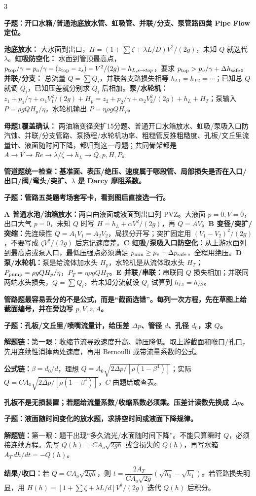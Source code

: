 \documentclass[a4paper]{article}
\newcommand{\qt}[1]{\vspace{0.10pt}\colorbox{Q}{\parbox{\dimexpr\linewidth-2\fboxsep}{\color{white}\bfseries #1}}\par}
\newcommand{\ans}[1]{\colorbox{G}{\parbox{\dimexpr\linewidth-2\fboxsep}{#1}}\par}
\newcommand{\warn}[1]{\colorbox{Y}{\parbox{\dimexpr\linewidth-2\fboxsep}{\color{E}\bfseries #1}}\par}
\newcommand{\chain}[1]{{\color{A}\bfseries 解题链：}#1\par}
\newcommand{\res}[1]{{\color{E}\bfseries 结果/收口：}#1\par}
\newcommand{\form}[1]{{\color{M}\bfseries 公式链：}#1\par}
\begin{document}
\begin{multicols}{3}
\qt{子题：开口水箱/普通池底放水管、虹吸管、并联/分支、泵管路四类 Pipe Flow 定位。}
\ans{\textbf{池底放水：} 大水面到出口，$H=(1+\sum\zeta+\lambda L/D)V^2/(2g)$，未知 $Q$ 就迭代 $\lambda$。\textbf{虹吸防空化：} 水面到管顶最高点，$p_{\rm top}/\gamma=p_a/\gamma-(z_{\rm top}-z_s)-V^2/(2g)-h_{L,s\to top}$，要求 $p_{\rm top}>p_v/\gamma+\Delta h_{\rm safe}$。\textbf{并联/分支：} 总流量 $Q=\sum Q_i$，并联各支路损失相等 $h_{L1}=h_{L2}=\cdots$；已知总 $Q$ 就调 $Q_i$，已知压差就分别求 $Q_i$ 后相加。\textbf{泵/水轮机：} $z_1+p_1/\gamma+\alpha_1V_1^2/(2g)+H_p=z_2+p_2/\gamma+\alpha_2V_2^2/(2g)+h_L+H_T$；泵输入 $P=\rho gQH_p/\eta$，水轮机输出 $P=\eta\rho gQH_T$。}
\ans{\textbf{母题1覆盖确认：} 两油箱变径突扩15分题、普通开口水箱放水、虹吸/泵吸入口防汽蚀、并联/分支管路、泵扬程/水轮机功率、粗糙管反推粗糙度、孔板/文丘里流量计、液面随时间下降，都归到这一母题；共同骨架都是 $A\to V\to Re\to\lambda/\zeta\to h_L\to Q,p,H,P$。}
\warn{管道题统一检查：基准面、表压/绝压、速度属于哪段管、局部损失是否在入口/出口/阀/弯头/突扩、$\lambda$ 是 Darcy 摩阻系数。}

\qt{子题：管路五类题考场套写卡，看到图后直接选一行。}
\ans{\textbf{A 普通水池/油箱放水：}两自由液面或液面到出口列 PVZ。大液面 $p=0,V=0$，出口大气 $p=0$，未知 $Q$ 时写 $H=h_L+\alpha V^2/(2g)$，再 $Q=AV$。\textbf{B 变径/突扩/突缩：}先连续性 $Q=A_1V_1=A_2V_2$，局损分开写；突扩固定用 $(V_1-V_2)^2/(2g)$，不要写成 $\zeta V^2/(2g)$ 后忘记速度差。\textbf{C 虹吸/泵吸入口防空化：}从上游水面列到最高点或泵入口，最低压强点必须满足 $p_{\min}\ge p_v+\Delta p_{\rm safe}$，全程用绝压。\textbf{D 泵/水轮机：}泵是给流体加水头 $H_p$，水轮机是从流体取水头 $H_T$；$P_{\rm pump}=\rho gQH_p/\eta$，$P_T=\eta\rho gQH_T$。\textbf{E 并联/串联：}串联同 $Q$ 损失相加；并联同两端水头损失，$Q=\sum Q_i$，若未知分流就设 $Q_i$ 试算到 $h_{L1}=h_{L2}$。}
\warn{管路题最容易丢分的不是公式，而是“截面选错”。每列一次方程，先在草图上给截面编号，并在旁边写 $p,V,z,A$。}

\qt{子题：孔板/文丘里/喷嘴流量计，给压差 $\Delta p$、管径 $d$、孔径 $d_0$，求 $Q$。}
\chain{第一眼：收缩节流导致速度升高、静压降低。取上游截面和喉口/孔口，先用连续性消掉两处速度，再用 Bernoulli 或带流量系数的公式。}
\form{$\beta=d_0/d$，理想 $Q=A_0\sqrt{2\Delta p/[\rho(1-\beta^4)]}$；实际 $Q=C A_0\sqrt{2\Delta p/[\rho(1-\beta^4)]}$，$C$ 由题给或查表。}
\warn{孔板不是无损装置；若题给流量系数/收缩系数必须乘。压差计读数先换成 $\Delta p$。}

\qt{子题：液面随时间变化的放水题，求排空时间或液面下降规律。}
\chain{第一眼：题干出现“多久流光/水面随时间下降”。不能只算瞬时 $Q$，必须接连续方程。先写 $Q(h)=C A_o\sqrt{2gh}$ 或含损失的 $Q(h)$，再写水箱 $A_T\,dh/dt=-Q(h)$。}
\res{若 $Q=C A_o\sqrt{2gh}$，则 $t=\dfrac{2A_T}{C A_o\sqrt{2g}}\left(\sqrt{h_0}-\sqrt{h_1}\right)$。若管路损失明显，用 $H(h)=[1+\sum\zeta+\lambda L/d]V^2/(2g)$ 迭代 $Q(h)$ 后积分。}



\end{multicols}
\end{document}
